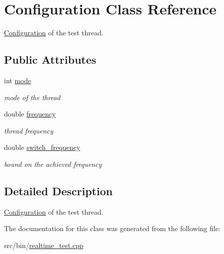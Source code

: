 \hypertarget{classConfiguration}{}\section{Configuration Class Reference}
\label{classConfiguration}


\hyperlink{classConfiguration}{Configuration} of the test thread.  


\subsection*{Public Attributes}
\begin{DoxyCompactItemize}
\item 
\mbox{\label{classConfiguration_a7d5f2036941892a92f343c50a1606b4d}} 
int \hyperlink{classConfiguration_a7d5f2036941892a92f343c50a1606b4d}{mode}
\begin{DoxyCompactList}\small\item\em mode of the thread \end{DoxyCompactList}\item 
\mbox{\label{classConfiguration_ac6f09be53002bfb5404a241b3ce5486e}} 
double \hyperlink{classConfiguration_ac6f09be53002bfb5404a241b3ce5486e}{frequency}
\begin{DoxyCompactList}\small\item\em thread frequency \end{DoxyCompactList}\item 
\mbox{\label{classConfiguration_abeda8dee257cb5a21afa2d1f6fab758c}} 
double \hyperlink{classConfiguration_abeda8dee257cb5a21afa2d1f6fab758c}{switch\+\_\+frequency}
\begin{DoxyCompactList}\small\item\em bound on the achieved frequency \end{DoxyCompactList}\end{DoxyCompactItemize}


\subsection{Detailed Description}
\hyperlink{classConfiguration}{Configuration} of the test thread. 

The documentation for this class was generated from the following file\+:\begin{DoxyCompactItemize}
\item 
src/bin/\hyperlink{realtime__test_8cpp}{realtime\+\_\+test.\+cpp}\end{DoxyCompactItemize}
